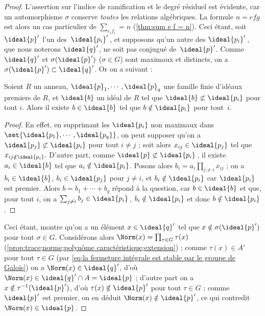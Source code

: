\documentclass[11pt, useosf,
  title in boldface,
  theorem in new line,
  theorem numbering = section,
  number theorems separately,
]{simplivre}
\begin{document}
    \begin{proof}
        L'assertion sur l'indice de ramification et le degré résiduel est évidente, car un automorphisme \( \sigma \) conserve \emph{toutes} les relations algébriques. La formule \( n = efg \) est alors un cas particulier de \( \sum_{e_i f_i} = n \) (\cref{thm:sum e f = n}). Ceci étant, soit \( \ideal{p}' \) l'un des~\( \ideal{p_i}' \)\,, et supposons qu'un autre des \( \ideal{p_i}' \)\,, que nous noterons \( \ideal{q}' \), ne soit pas conjugué de~\( \ideal{p}' \). Comme \( \ideal{q}' \) et \( \sigma(\ideal{p}') \) (\( \sigma \in G \)) sont maximaux et distincts, on a \( \sigma(\ideal{p}') \subset \ideal{q}' \). Or on a  suivant :
        \begin{lemma}\label{lem:évitement des idéaux premiers}
            Soient \( R \) un anneau, \( \ideal{p}_1, \cdots, \ideal{p}_q \) une famille finie d'idéaux premiers de \( R \), et \( \ideal{b} \) un idéal de \( R \) tel que \( \ideal{b} \not\subset \ideal{p_i} \) pour tout \( i \). Alors il existe \( b \in \ideal{b} \) tel que \( b \notin \ideal{p_i} \) pour tout~\( i \).
        \end{lemma}
        \begin{proof}
            En effet, en supprimant les \( \ideal{p_i} \) non maximaux dans \( \set{\ideal{p_1}, \cdots, \ideal{p_q}} \), on peut supposer qu'on a \( \ideal{p_j} \not\subset \ideal{p_i} \) pour tout \( i \neq j \) ; soit alors \( x_{ij} \in \ideal{p_j} \) tel que \( x_{ij \notin \ideal{p_i}} \). D'autre part, comme \( \ideal{p} \not\subset \ideal{p_i} \)\,, il existe \( a_i \in \ideal{b} \) tel que \( a_i \notin \ideal{p_i} \). Posons alors \( b_i = a_i \prod_{j \neq i} x_{ij} \) ; on a \( b_i \in \ideal{b} \), \( b_i \in \ideal{p_j} \) pour \( j \neq i \), et \( b_i \notin \ideal{p_i} \) car \( \ideal{p_i} \) est premier. Alors \( b = b_1 + \cdots + b_q \) répond à la question, car \( b \in \ideal{b} \) et que, pour tout \( i \), on a \( \sum_{j \neq i} b_j \in \ideal{p_i} \)\,, \( b_i \notin \ideal{p_i} \) et donc \( b \notin \ideal{p_i} \).
        \end{proof}
        Ceci étant,  montre qu'on a un élément \( x \in \ideal{q}' \) tel que \( x \notin \sigma(\ideal{p}') \) pour tout \( \sigma \in G \). Considérons alors \( \Norm(x) = \prod_{\tau \in G} \tau(x) \) (\cref{prop:trace;norme;polynôme caractéristique;extension}) ; comme \( \tau(x) \in A' \) pour tout \( \tau \in G \) (par \eqref{eq:la fermeture intégrale est stable par le groupe de Galois}) on a \( \Norm(x) \in \ideal{q}' \), d'où \( \Norm(x) \in \ideal{q}' \cap A = \ideal{p} \) ; d'autre part on a \( x \notin \tau^{-1}(\ideal{p}') \), d'où \( \tau(x) \notin \ideal{p}' \) pour tout \( \tau \in G \) ; comme \( \ideal{p}' \) est premier, on en déduit \( \Norm(x) \notin \ideal{p}' \), ce qui contredit \( \Norm(x) \in \ideal{p} \).
    \end{proof}
\end{document}
